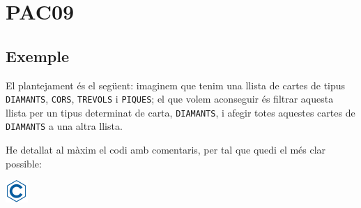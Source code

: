 \documentclass[]{book}
\begin{document}
\chapter{PAC09}\label{pac09}

\section{Exemple}\label{exemple-1}

El plantejament és el següent: imaginem que tenim una llista de cartes
de tipus \texttt{DIAMANTS}, \texttt{CORS}, \texttt{TREVOLS} i
\texttt{PIQUES}; el que volem aconseguir és filtrar aquesta llista per
un tipus determinat de carta, \texttt{DIAMANTS}, i afegir totes aquestes
cartes de \texttt{DIAMANTS} a una altra llista.

He detallat al màxim el codi amb comentaris, per tal que quedi el més
clar possible:

\includegraphics{./img/c.png}
\end{document}
